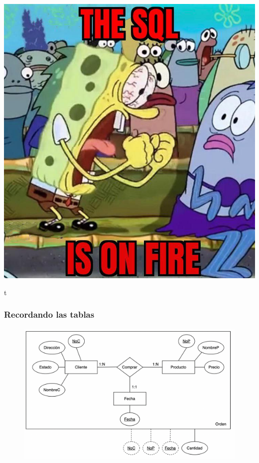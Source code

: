 \documentclass[
	10pt, %
	aspectratio=169, %
]{beamer}
\begin{document}

{
	{%
		\includegraphics[width=\paperwidth,height=\paperheight]{sql_on_fire.jpg}
	}
	
	\begin{frame}
	\end{frame}
}


\begin{frame}{t}
	
	\frametitle{Recordando las tablas}
	
	\begin{figure}[h]
		\centering
		\includegraphics[scale=0.5]{bd.png}
	\end{figure}
	
	
\end{frame}
\end{document}

